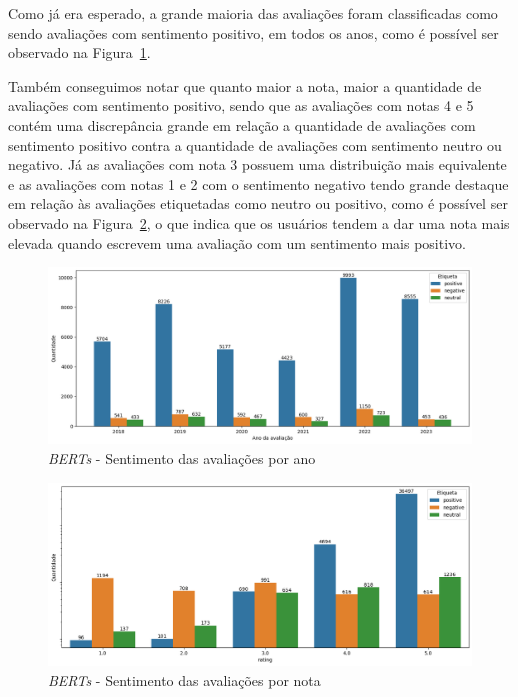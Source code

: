 Como já era esperado, a grande maioria das avaliações foram classificadas como sendo avaliações com sentimento positivo, em todos os anos, como é possível ser observado na Figura~\ref{img:sentimento_timechart_bert}.

Também conseguimos notar que quanto maior a nota, maior a quantidade de avaliações com sentimento positivo, sendo que as avaliações com notas 4 e 5 contém uma discrepância grande em relação a quantidade de avaliações com sentimento positivo contra a quantidade de avaliações com sentimento neutro ou negativo. Já as avaliações com nota 3 possuem uma distribuição mais equivalente e as avaliações com notas 1 e 2 com o sentimento negativo tendo grande destaque em relação às avaliações etiquetadas como neutro ou positivo, como é possível ser observado na Figura~\ref{img:sentimento_nota_bert}, o que indica que os usuários tendem a dar uma nota mais elevada quando escrevem uma avaliação com um sentimento mais positivo.

\begin{figure}
	\centering
	\includegraphics[width=1\textwidth]{figs/bert/sentimento_ano.png}
	\caption{\textit{BERTs} - Sentimento das avaliações por ano}
	\label{img:sentimento_timechart_bert}
\end{figure}

\begin{figure}
	\centering
	\includegraphics[width=1\textwidth]{figs/bert/sentimento_nota.png}
	\caption{\textit{BERTs} - Sentimento das avaliações por nota}
	\label{img:sentimento_nota_bert}
\end{figure}

